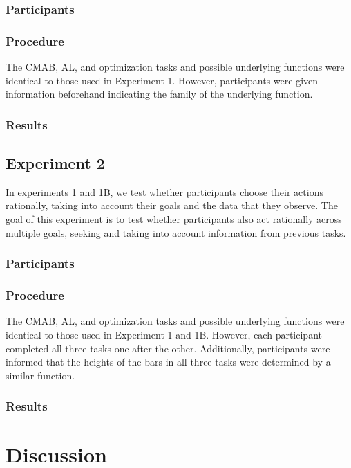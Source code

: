 \documentclass[10pt,letterpaper]{article}
\begin{document}
	
	\subsubsection{Participants}
	
	\subsubsection{Procedure}  
	
	The CMAB, AL, and optimization tasks and possible underlying functions were identical to those used in Experiment 1. However, participants were given information beforehand indicating the family of the underlying function.
	
	\subsubsection{Results}
	
	\subsection{Experiment 2}
	
	In experiments 1 and 1B, we test whether participants choose their actions rationally, taking into account their goals and the data that they observe. The goal of this experiment is to test whether participants also act rationally across multiple goals, seeking and taking into account information from previous tasks.
	
	\subsubsection{Participants}
	
	\subsubsection{Procedure}  
	
	The CMAB, AL, and optimization tasks and possible underlying functions were identical to those used in Experiment 1 and 1B. However, each participant completed all three tasks one after the other. Additionally, participants were informed that the heights of the bars in all three tasks were determined by a similar function.
	
	\subsubsection{Results}
	
	\section{Discussion}
	
	
	
	
	\setlength{\bibleftmargin}{.125in}
	\setlength{\bibindent}{-\bibleftmargin}
	
	
	
	
\end{document}
